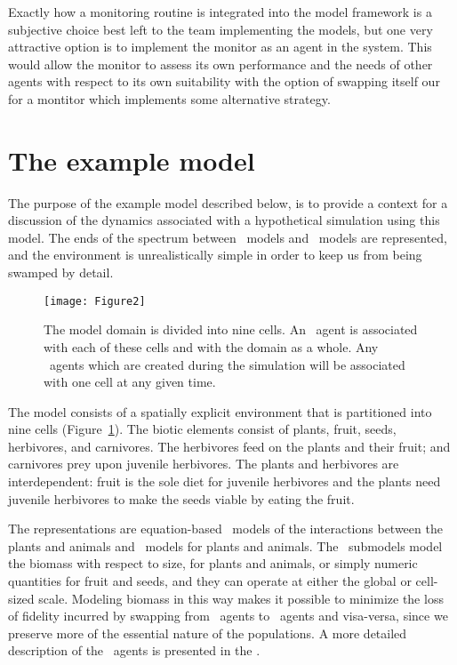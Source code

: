 Exactly how a monitoring routine is integrated into the model
framework is a subjective choice best left to the team implementing
the models, but one very attractive option is to implement the monitor
as an agent in the system. This would allow the monitor to assess its
own performance and the needs of other agents with respect to its own
suitability with the option of swapping itself our for a montitor
which implements some alternative strategy. 


\section{The example model}

The purpose of the example model described below, is to provide a
context for a discussion of the dynamics associated with a
hypothetical simulation using this model.  The ends of the
spectrum between \SD\ models and \IB\ models are represented, and the
environment is unrealistically simple in order to keep us from being
swamped by detail. 

\begin{figure}\label{domain}
\begin{center}
  \texttt{[image: Figure2]}
  \caption{The model domain is divided into nine cells. An \SD\ agent
    is associated with each of these cells and with the domain as a
    whole. Any \IB\ agents which are created during the simulation
    will be associated with one cell at any given time.}
\end{center}
\end{figure}


The model consists of a spatially explicit environment that is
partitioned into nine cells (Figure~\ref{domain}). The biotic elements
consist of plants, fruit, seeds, herbivores, and carnivores.  The
herbivores feed on the plants and their fruit; and carnivores prey
upon juvenile herbivores.  The plants and herbivores are
interdependent: fruit is the sole diet for juvenile herbivores and the
plants need juvenile herbivores to make the seeds viable by eating the
fruit.

The rep\-re\-sen\-ta\-tions are equation-based \SD\ models of the interactions
between the plants and animals and \IB\ models for plants and
animals. The \SD\ sub\-models model the biomass with respect
to size, for plants and animals, or simply numeric quantities for
fruit and seeds, and they can operate at either the global or
cell-sized scale. Modeling biomass in this way makes it possible to
minimize the loss of fidelity incurred by swapping from \IB\ agents to
\SD\ agents and visa-versa, since we preserve more of the essential
nature of the populations. A more detailed description of the
\SD\ agents is presented in the \SuppMaterial.

